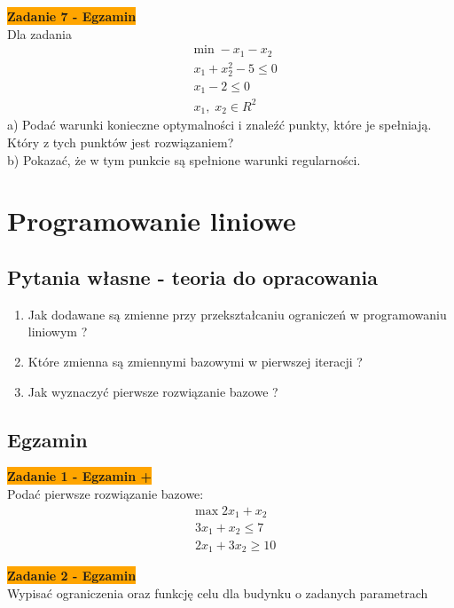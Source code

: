 \documentclass[a4paper,11pt]{article}
\begin{document}
\begin{framed}
\textbf{\colorbox{orange}{Zadanie 7 - Egzamin}} \\
Dla zadania 
\begin{align*}
&\text{min} \; -x_1-x_2 \\
&x_1+x_2^2-5\leq 0 \\
&x_1 - 2 \leq 0 \\
&x_1 , \; x_2 \in R^2
\end{align*}
a) Podać warunki konieczne optymalności i znaleźć punkty, które je spełniają. Który z tych punktów jest rozwiązaniem? \\
b) Pokazać, że w tym punkcie są spełnione warunki regularności. 
\end{framed}




\newpage
\section{Programowanie liniowe}

\subsection{Pytania własne - teoria do opracowania}

\begin{enumerate}

\item Jak dodawane są zmienne przy przekształcaniu ograniczeń w programowaniu liniowym ?
\item Które zmienna są zmiennymi bazowymi w pierwszej iteracji ?
\item Jak wyznaczyć pierwsze rozwiązanie bazowe ?


\end{enumerate}


\subsection{Egzamin}

\begin{framed}
\textbf{\colorbox{orange}{Zadanie 1 - Egzamin +}} \\
Podać pierwsze rozwiązanie bazowe: 
\begin{align*}
& \text{max} \; 2x_1 + x_2 \\
& 3x_1+x_2 \leq 7 \\
& 2x_1+3x_2 \geq 10
\end{align*}
\end{framed}

\begin{framed}
\textbf{\colorbox{orange}{Zadanie 2 - Egzamin }} \\
Wypisać ograniczenia oraz funkcję celu dla budynku o zadanych parametrach

\end{framed}
\end{document}
